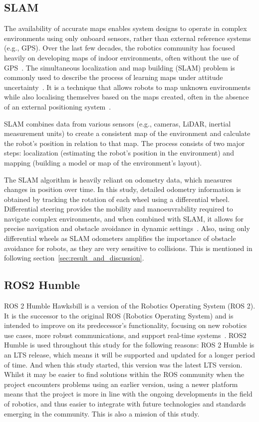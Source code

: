 \subsection{SLAM}
\label{subsec:slam}
The availability of accurate maps enables system designs to operate in complex environments using only onboard sensors, 
rather than external reference systems (e.g., GPS). 
Over the last few decades, the robotics community has focused heavily on developing maps of indoor environments, often without the use of GPS~\cite{slam}. 
The simultaneous localization and map building (SLAM) problem is commonly used to describe the process of learning maps under attitude uncertainty~\cite{slamoverview}. 
It is a technique that allows robots to map unknown environments while also localising themselves based on the maps created, 
often in the absence of an external positioning system~\cite{slamii}.

SLAM combines data from various sensors 
(e.g., cameras, LiDAR, inertial measurement units) to create a consistent map of the environment and calculate the robot's position in relation to that map. 
The process consists of two major steps: localization (estimating the robot's position in the environment) and mapping (building a model or map of the environment's layout).

The SLAM algorithm is heavily reliant on odometry data, which measures changes in position over time. 
In this study, detailed odometry information is obtained by tracking the rotation of each wheel using a differential wheel. 
Differential steering provides the mobility and manoeuvrability required to navigate complex environments, 
and when combined with SLAM, it allows for precise navigation and obstacle avoidance in dynamic settings~\cite{slamtutorial}. 
Also, using only differential wheels as SLAM odometers amplifies the importance of obstacle avoidance for robots, 
as they are very sensitive to collisions. This is mentioned in following section~\ref{sec:result_and_discussion}.

\subsection{ROS2 Humble}
ROS 2 Humble Hawksbill is a version of the Robotics Operating System (ROS 2).
It is the successor to the original ROS (Robotics Operating System) and is intended to improve on its predecessor's functionality,
focusing on new robotics use cases, more robust communications, and support real-time systems~\cite{ros2}.
ROS2 Humble is used throughout this study for the following reasons: ROS 2 Humble is an LTS release, 
which means it will be supported and updated for a longer period of time. 
And when this study started, this version was the latest LTS version. 
Whilst it may be easier to find solutions within the ROS community when the project encounters problems using an earlier version, 
using a newer platform means that the project is more in line with the ongoing developments in the field of robotics, 
and thus easier to integrate with future technologies and standards emerging in the community. This is also a mission of this study.


